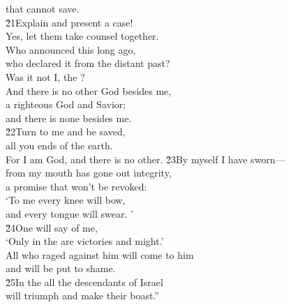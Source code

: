 \begin{poetry}
\poemll    that cannot save. \\
\poeml \v{21}Explain and present a case! \\
\poemll    Yes, let them take counsel together. \\
\poeml Who announced this long ago, \\
\poemll    who declared it from the distant past? \\
\poemlll       Was it not I, the ? \\
\poeml And there is no other God besides me, \\
\poemll    a righteous God and Savior; \\
\poemlll       and there is none besides me. \\
\poeml \v{22}Turn to me and be saved, \\
\poemll    all you ends of the earth. \\
\poemlll       For I am God, and there is no other.
\poeml \v{23}By myself I have sworn--- \\
\poemll    from my mouth has gone out integrity, \\
\poemlll       a promise that won't be revoked: \\
\poeml `To me every knee will bow, \\
\poemll    and every tongue will swear. ' \\
\poeml \v{24}One will say of me, \\
\poemll    `Only in the  are victories and might.' \\
\poeml All who raged against him will come to him \\
\poemll    and will be put to shame. \\
\poeml \v{25}In the  all the descendants of Israel \\
\poemll    will triumph and make their boast.''
\end{poetry}

